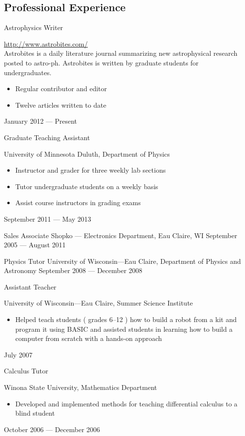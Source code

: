 \documentclass[margin,line,letterpaper]{res}
\begin{document}
\begin{resume}
\section{Professional Experience}



\object
{Astrophysics Writer}
{\rm \href{http://astrobites.com/}{http://www.astrobites.com/} \noemph \\
Astrobites is a daily literature journal summarizing new astrophysical research posted to astro-ph. Astrobites is written by graduate students for 	undergraduates.
	\begin{itemize}
		\item Regular contributor and editor
		\item Twelve articles written to date 
	\end{itemize}
 }
{January 2012 --- Present}


\object
{Graduate Teaching Assistant}
{University of Minnesota Duluth, Department of Physics \noemph
\begin{itemize}
		\item Instructor and grader for three weekly lab sections
		\item Tutor undergraduate students on a weekly basis
		\item Assist course instructors in grading exams
	\end{itemize}
 }
{September 2011 --- May 2013}


\object
{Sales Associate}
{Shopko --- Electronics Department, Eau Claire, WI}
{September 2005 --- August 2011}


\object
{Physics Tutor}
{University of Wisconsin---Eau Claire, Department of Physics and Astronomy}
{September 2008 --- December 2008}


\object
{Assistant Teacher}
{University of Wisconsin---Eau Claire, Summer Science Institute \noemph
\begin{itemize}
		\item Helped teach students ( grades 6--12 ) how to build a robot from a kit and program it using BASIC and assisted students in learning how to build a computer from scratch with a hands-on approach
	\end{itemize}
 }
{July 2007}


\object
{Calculus Tutor}
{Winona State University, Mathematics Department \noemph
\begin{itemize}
		\item Developed and implemented methods for teaching differential calculus to a blind student
	\end{itemize}
 }
{October 2006 --- December 2006}



\end{resume}
\end{document}
